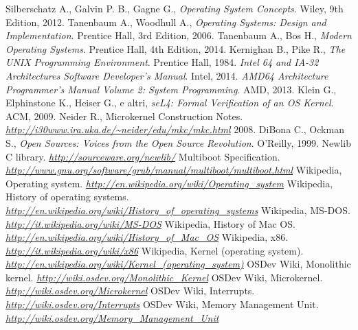 \documentclass[12pt,a4paper]{report}
\begin{document}
	

\begin{thebibliography}{}
		Silberschatz A., Galvin P. B., Gagne G.,
		\emph{Operating System Concepts}.
		Wiley,
		9th Edition,
		2012.
		Tanenbaum A., Woodhull A.,
		\emph{Operating Systems: Design and Implementation}.
		Prentice Hall,
		3rd Edition,
		2006.
		Tanenbaum A., Bos H.,
		\emph{Modern Operating Systems}.
		Prentice Hall,
		4th Edition,
		2014.
		Kernighan B., Pike R.,
		\emph{The UNIX Programming Environment}.
		Prentice Hall,
		1984.
		\emph{Intel 64 and IA-32 Architectures Software Developer’s Manual}.
		Intel,
		2014.
		\emph{AMD64 Architecture Programmer’s Manual Volume 2: System Programming}.
		AMD,
		2013.
		Klein G., Elphinstone K., Heiser G., e altri,
		\emph{seL4: Formal Verification of an OS Kernel}.
		ACM,
		2009.
		Neider R.,
		Microkernel Construction Notes.
		\emph{\url{http://i30www.ira.uka.de/~neider/edu/mkc/mkc.html}}
		2008.
		DiBona C., Ockman S.,
		\emph{Open Sources: Voices from the Open Source Revolution}.
		O'Reilly,
		1999.
		Newlib C library.
		\emph{\url{http://sourceware.org/newlib/}}
		Multiboot Specification.
		\emph{\url{http://www.gnu.org/software/grub/manual/multiboot/multiboot.html}}
		Wikipedia, Operating system.
		\emph{\url{http://en.wikipedia.org/wiki/Operating_system}}
		Wikipedia, History of operating systems.
		\emph{\url{http://en.wikipedia.org/wiki/History_of_operating_systems}}
		Wikipedia, MS-DOS.
		\emph{\url{http://it.wikipedia.org/wiki/MS-DOS}}
		Wikipedia, History of Mac OS.
		\emph{\url{http://en.wikipedia.org/wiki/History_of_Mac_OS}}
		Wikipedia, x86.
		\emph{\url{http://it.wikipedia.org/wiki/x86}}
		Wikipedia, Kernel (operating system).
		\emph{\url{http://en.wikipedia.org/wiki/Kernel_(operating_system)}}
		OSDev Wiki, Monolithic kernel.
		\emph{\url{http://wiki.osdev.org/Monolithic_Kernel}}
		OSDev Wiki, Microkernel.
		\emph{\url{http://wiki.osdev.org/Microkernel}}
		OSDev Wiki, Interrupts.
		\emph{\url{http://wiki.osdev.org/Interrupts}}
		OSDev Wiki, Memory Management Unit.
		\emph{\url{http://wiki.osdev.org/Memory_Management_Unit}}
\end{thebibliography}
\end{document}
